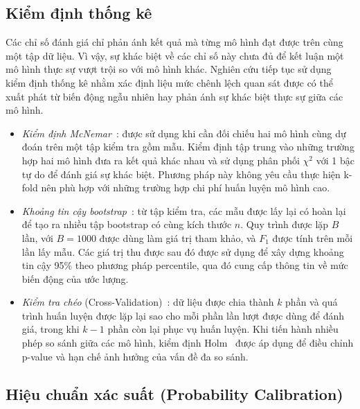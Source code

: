\subsection{Kiểm định thống kê}

Các chỉ số đánh giá chỉ phản ánh kết quả mà từng mô hình đạt được trên cùng một tập dữ liệu. Vì vậy, sự khác biệt về các chỉ số này chưa đủ để kết luận một mô hình thực sự vượt trội so với mô hình khác. Nghiên cứu tiếp tục sử dụng kiểm định thống kê nhằm xác định liệu mức chênh lệch quan sát được có thể xuất phát từ biến động ngẫu nhiên hay phản ánh sự khác biệt thực sự giữa các mô hình.

\begin{itemize}[leftmargin=2em]

  \item \textit{Kiểm định McNemar}~\cite{mcnemar1947}: được sử dụng khi cần đối chiếu hai mô hình cùng dự đoán trên một tập kiểm tra gồm \ntest{} mẫu. Kiểm định tập trung vào những trường hợp hai mô hình đưa ra kết quả khác nhau và sử dụng phân phối $\chi^2$ với 1 bậc tự do để đánh giá sự khác biệt. Phương pháp này không yêu cầu thực hiện k-fold nên phù hợp với những trường hợp chi phí huấn luyện mô hình cao.

  \item \textit{Khoảng tin cậy bootstrap}~\cite{efron1979bootstrap}: từ tập kiểm tra, các mẫu được lấy lại có hoàn lại để tạo ra nhiều tập bootstrap có cùng kích thước $n$. Quy trình được lặp $B$ lần, với $B = 1000$ được dùng làm giá trị tham khảo, và $F_1$ được tính trên mỗi lần lấy mẫu. Các giá trị thu được sau đó được sử dụng để xây dựng khoảng tin cậy 95\% theo phương pháp percentile, qua đó cung cấp thông tin về mức biến động của ước lượng.

  \item \textit{Kiểm tra chéo} (Cross-Validation)~\cite{pedregosa2011sklearn}: dữ liệu được chia thành $k$ phần và quá trình huấn luyện được lặp lại sao cho mỗi phần lần lượt được dùng để đánh giá, trong khi $k-1$ phần còn lại phục vụ huấn luyện. Khi tiến hành nhiều phép so sánh giữa các mô hình, kiểm định Holm~\cite{holm1979} được áp dụng để điều chỉnh p-value và hạn chế ảnh hưởng của vấn đề đa so sánh.

\end{itemize}

\subsection{Hiệu chuẩn xác suất (Probability Calibration)}

